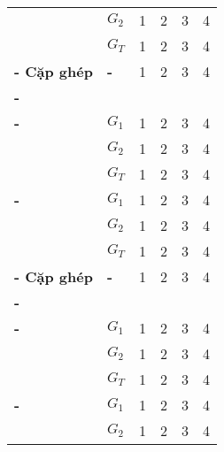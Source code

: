 \begin{longtabu}{| >{\bfseries\centering}p{2cm} | >{\bfseries\centering}p{0.5cm} | X[c] X[c] X[c] X[c] |}
	& $G_2$ \newline & 1 & 2 & 3 & 4 \\
	& $G_T$ \newline & 1 & 2 & 3 & 4 \\
	\tabucline[1pt]-
	Cặp ghép \newline & - & 1 & 2 & 3 & 4 \\
	\tabucline[2pt]-
	 \\
	\tabucline[1pt]-
	 \newline & $G_1$ & 1 & 2 & 3 & 4 \\
	& $G_2$ \newline & 1 & 2 & 3 & 4 \\
	& $G_T$ \newline & 1 & 2 & 3 & 4 \\
	\tabucline[1pt]-
	 \newline & $G_1$ & 1 & 2 & 3 & 4 \\
	& $G_2$ \newline & 1 & 2 & 3 & 4 \\
	& $G_T$ \newline & 1 & 2 & 3 & 4 \\
	\tabucline[1pt]-
	Cặp ghép \newline & - & 1 & 2 & 3 & 4 \\
	\tabucline[2pt]-
	 \\
	\tabucline[1pt]-
	 \newline & $G_1$ & 1 & 2 & 3 & 4 \\
	& $G_2$ \newline & 1 & 2 & 3 & 4 \\
	& $G_T$ \newline & 1 & 2 & 3 & 4 \\
	\tabucline[1pt]-
	 \newline & $G_1$ & 1 & 2 & 3 & 4 \\
	& $G_2$ \newline & 1 & 2 & 3 & 4 \\

\end{longtabu}

